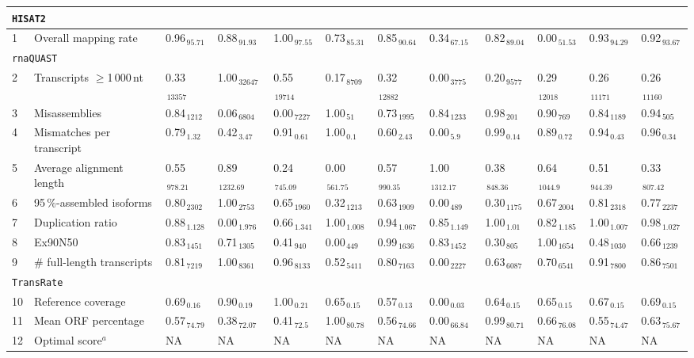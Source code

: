 \documentclass{scrartcl}
\begin{document}
\begin{landscape}
\begin{table}
\begin{scriptsize}
\begin{tabular}{llllllllllll}
\multicolumn{11}{l}{\texttt{HISAT2}}\\ 
\midrule
1 & Overall mapping rate  & 0.96$_{\,95.71}$ & 0.88$_{\,91.93}$ & 1.00$_{\,97.55}$ & 0.73$_{\,85.31}$ & 0.85$_{\,90.64}$ & 0.34$_{\,67.15}$ & 0.82$_{\,89.04}$ & 0.00$_{\,51.53}$ & 0.93$_{\,94.29}$ & 0.92$_{\,93.67}$ \\\midrule
\multicolumn{11}{l}{\texttt{rnaQUAST}}\\ 
\midrule
2 & Transcripts $\geq$1\,000\,nt  & 0.33$_{\,13357}$ & 1.00$_{\,32647}$ & 0.55$_{\,19714}$ & 0.17$_{\,8709}$ & 0.32$_{\,12882}$ & 0.00$_{\,3775}$ & 0.20$_{\,9577}$ & 0.29$_{\,12018}$ & 0.26$_{\,11171}$ & 0.26$_{\,11160}$ \\3 & Misassemblies  & 0.84$_{\,1212}$ & 0.06$_{\,6804}$ & 0.00$_{\,7227}$ & 1.00$_{\,51}$ & 0.73$_{\,1995}$ & 0.84$_{\,1233}$ & 0.98$_{\,201}$ & 0.90$_{\,769}$ & 0.84$_{\,1189}$ & 0.94$_{\,505}$ \\4 & Mismatches per transcript  & 0.79$_{\,1.32}$ & 0.42$_{\,3.47}$ & 0.91$_{\,0.61}$ & 1.00$_{\,0.1}$ & 0.60$_{\,2.43}$ & 0.00$_{\,5.9}$ & 0.99$_{\,0.14}$ & 0.89$_{\,0.72}$ & 0.94$_{\,0.43}$ & 0.96$_{\,0.34}$ \\5 & Average alignment length  & 0.55$_{\,978.21}$ & 0.89$_{\,1232.69}$ & 0.24$_{\,745.09}$ & 0.00$_{\,561.75}$ & 0.57$_{\,990.35}$ & 1.00$_{\,1312.17}$ & 0.38$_{\,848.36}$ & 0.64$_{\,1044.9}$ & 0.51$_{\,944.39}$ & 0.33$_{\,807.42}$ \\6 & 95\,\%-assembled isoforms  & 0.80$_{\,2302}$ & 1.00$_{\,2753}$ & 0.65$_{\,1960}$ & 0.32$_{\,1213}$ & 0.63$_{\,1909}$ & 0.00$_{\,489}$ & 0.30$_{\,1175}$ & 0.67$_{\,2004}$ & 0.81$_{\,2318}$ & 0.77$_{\,2237}$ \\7 & Duplication ratio  & 0.88$_{\,1.128}$ & 0.00$_{\,1.976}$ & 0.66$_{\,1.341}$ & 1.00$_{\,1.008}$ & 0.94$_{\,1.067}$ & 0.85$_{\,1.149}$ & 1.00$_{\,1.01}$ & 0.82$_{\,1.185}$ & 1.00$_{\,1.007}$ & 0.98$_{\,1.027}$ \\\midrule
8 & Ex90N50  & 0.83$_{\,1451}$ & 0.71$_{\,1305}$ & 0.41$_{\,940}$ & 0.00$_{\,449}$ & 0.99$_{\,1636}$ & 0.83$_{\,1452}$ & 0.30$_{\,805}$ & 1.00$_{\,1654}$ & 0.48$_{\,1030}$ & 0.66$_{\,1239}$ \\9 & \# full-length transcripts  & 0.81$_{\,7219}$ & 1.00$_{\,8361}$ & 0.96$_{\,8133}$ & 0.52$_{\,5411}$ & 0.80$_{\,7163}$ & 0.00$_{\,2227}$ & 0.63$_{\,6087}$ & 0.70$_{\,6541}$ & 0.91$_{\,7800}$ & 0.86$_{\,7501}$ \\\midrule
\multicolumn{11}{l}{\texttt{TransRate}}\\ 
\midrule
10 & Reference coverage  & 0.69$_{\,0.16}$ & 0.90$_{\,0.19}$ & 1.00$_{\,0.21}$ & 0.65$_{\,0.15}$ & 0.57$_{\,0.13}$ & 0.00$_{\,0.03}$ & 0.64$_{\,0.15}$ & 0.65$_{\,0.15}$ & 0.67$_{\,0.15}$ & 0.69$_{\,0.15}$ \\11 & Mean ORF percentage  & 0.57$_{\,74.79}$ & 0.38$_{\,72.07}$ & 0.41$_{\,72.5}$ & 1.00$_{\,80.78}$ & 0.56$_{\,74.66}$ & 0.00$_{\,66.84}$ & 0.99$_{\,80.71}$ & 0.66$_{\,76.08}$ & 0.55$_{\,74.47}$ & 0.63$_{\,75.67}$ \\12 & Optimal score$^{a}$  & NA & NA & NA & NA & NA & NA & NA & NA & NA & NA\\ 

\end{tabular}
\end{scriptsize}
\end{table}
\end{landscape}
\end{document}
